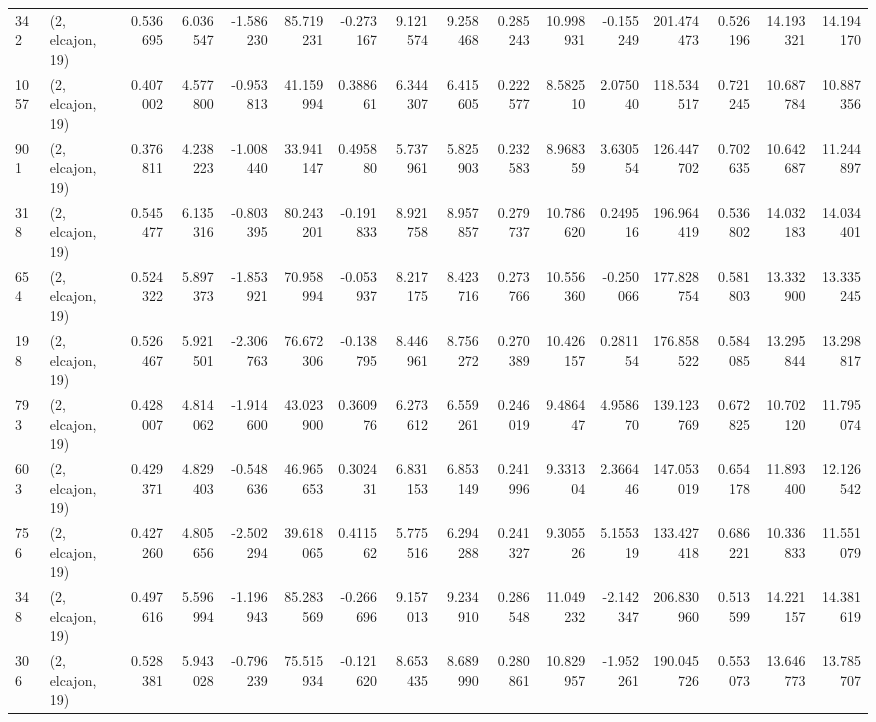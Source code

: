 \begin{tabular}{llrrrrrrrrrrrrrr}
342  &  (2, elcajon, 19) &   0.536695 &   6.036547 &  -1.586230 &     85.719231 &   -0.273167 &    9.121574 &    9.258468 &  0.285243 &  10.998931 &  -0.155249 &   201.474473 &   0.526196 &  14.193321 &  14.194170 \\
1057 &  (2, elcajon, 19) &   0.407002 &   4.577800 &  -0.953813 &     41.159994 &    0.388661 &    6.344307 &    6.415605 &  0.222577 &   8.582510 &   2.075040 &   118.534517 &   0.721245 &  10.687784 &  10.887356 \\
901  &  (2, elcajon, 19) &   0.376811 &   4.238223 &  -1.008440 &     33.941147 &    0.495880 &    5.737961 &    5.825903 &  0.232583 &   8.968359 &   3.630554 &   126.447702 &   0.702635 &  10.642687 &  11.244897 \\
318  &  (2, elcajon, 19) &   0.545477 &   6.135316 &  -0.803395 &     80.243201 &   -0.191833 &    8.921758 &    8.957857 &  0.279737 &  10.786620 &   0.249516 &   196.964419 &   0.536802 &  14.032183 &  14.034401 \\
654  &  (2, elcajon, 19) &   0.524322 &   5.897373 &  -1.853921 &     70.958994 &   -0.053937 &    8.217175 &    8.423716 &  0.273766 &  10.556360 &  -0.250066 &   177.828754 &   0.581803 &  13.332900 &  13.335245 \\
198  &  (2, elcajon, 19) &   0.526467 &   5.921501 &  -2.306763 &     76.672306 &   -0.138795 &    8.446961 &    8.756272 &  0.270389 &  10.426157 &   0.281154 &   176.858522 &   0.584085 &  13.295844 &  13.298817 \\
793  &  (2, elcajon, 19) &   0.428007 &   4.814062 &  -1.914600 &     43.023900 &    0.360976 &    6.273612 &    6.559261 &  0.246019 &   9.486447 &   4.958670 &   139.123769 &   0.672825 &  10.702120 &  11.795074 \\
603  &  (2, elcajon, 19) &   0.429371 &   4.829403 &  -0.548636 &     46.965653 &    0.302431 &    6.831153 &    6.853149 &  0.241996 &   9.331304 &   2.366446 &   147.053019 &   0.654178 &  11.893400 &  12.126542 \\
756  &  (2, elcajon, 19) &   0.427260 &   4.805656 &  -2.502294 &     39.618065 &    0.411562 &    5.775516 &    6.294288 &  0.241327 &   9.305526 &   5.155319 &   133.427418 &   0.686221 &  10.336833 &  11.551079 \\
348  &  (2, elcajon, 19) &   0.497616 &   5.596994 &  -1.196943 &     85.283569 &   -0.266696 &    9.157013 &    9.234910 &  0.286548 &  11.049232 &  -2.142347 &   206.830960 &   0.513599 &  14.221157 &  14.381619 \\
306  &  (2, elcajon, 19) &   0.528381 &   5.943028 &  -0.796239 &     75.515934 &   -0.121620 &    8.653435 &    8.689990 &  0.280861 &  10.829957 &  -1.952261 &   190.045726 &   0.553073 &  13.646773 &  13.785707 \\

\end{tabular}
